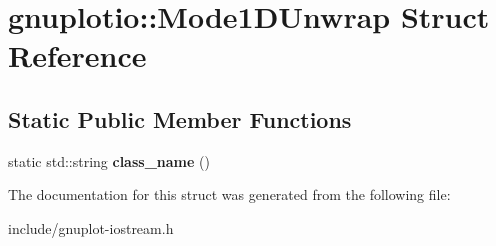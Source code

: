 \hypertarget{structgnuplotio_1_1Mode1DUnwrap}{}\section{gnuplotio\+:\+:Mode1\+D\+Unwrap Struct Reference}
\label{structgnuplotio_1_1Mode1DUnwrap}
\subsection*{Static Public Member Functions}
\begin{DoxyCompactItemize}
\item 
\mbox{\label{structgnuplotio_1_1Mode1DUnwrap_a2350096ad4d8b668f6df56c32cab69b6}} 
static std\+::string {\bfseries class\+\_\+name} ()
\end{DoxyCompactItemize}


The documentation for this struct was generated from the following file\+:\begin{DoxyCompactItemize}
\item 
include/gnuplot-\/iostream.\+h\end{DoxyCompactItemize}
